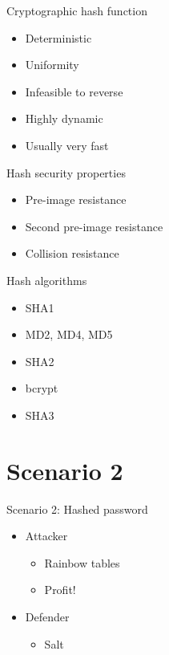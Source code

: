 \documentclass{curs}
\begin{document}
\begin{frame}{Cryptographic hash function}
  \begin{itemize}
    \item Deterministic
    \item Uniformity
    \item Infeasible to reverse
    \item Highly dynamic
    \item Usually very fast
  \end{itemize}
\end{frame}

\begin{frame}{Hash security properties}
  \begin{itemize}
    \item Pre-image resistance
    \item Second pre-image resistance
    \item Collision resistance
  \end{itemize}
\end{frame}

\begin{frame}{Hash algorithms}
  \begin{itemize}
    \item \color{red}SHA1
    \item \color{red}MD2, MD4, MD5
    \item \color{lime}SHA2
    \item \color{green}bcrypt
    \item \color{green}SHA3
  \end{itemize}
\end{frame}

\section {Scenario 2}

\begin{frame}{Scenario 2: Hashed password}
  \begin{itemize}
    \item Attacker \begin{itemize}
      \item Rainbow tables
      \item Profit!
    \end{itemize}
    \item Defender \begin{itemize}
      \item Salt
    \end{itemize}
  \end{itemize}
\end{frame}
\end{document}
